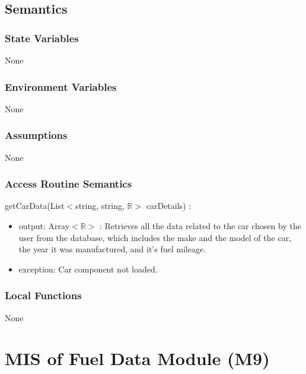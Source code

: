 \documentclass[12pt, titlepage]{article}
\begin{document}
\subsection{Semantics}

\subsubsection{State Variables}

None

\subsubsection{Environment Variables}

None

\subsubsection{Assumptions}

None

\subsubsection{Access Routine Semantics}

\noindent getCarData(List$<$string, string, $\mathbb{R}>$ carDetails) :
\begin{itemize}
\item output: Array$<\mathbb{R}>$ : Retrieves all the data related to the car chosen by the user from the database, which includes the make and the model of the car, the year it was manufactured, and it's fuel mileage.
\item exception: Car component not loaded.
\end{itemize}

\subsubsection{Local Functions}

None

\newpage



\section{MIS of Fuel Data Module (M9)} 
\end{document}

